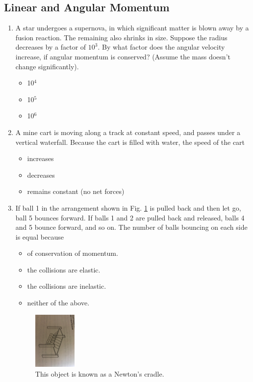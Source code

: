\documentclass[10pt]{article}
\begin{document}
\subsection{Linear and Angular Momentum}
\begin{enumerate}
\item A star undergoes a supernova, in which significant matter is blown away by a fusion reaction.  The remaining also shrinks in size.  Suppose the radius decreases by a factor of $10^3$.  By what factor does the angular velocity increase, if angular momentum is conserved? (Assume the mass doesn't change significantly).
\begin{itemize}
\item 10$^4$
\item 10$^5$
\item 10$^6$
\end{itemize}
\item A mine cart is moving along a track at constant speed, and passes under a vertical waterfall.  Because the cart is filled with water, the speed of the cart
\begin{itemize}
\item increases
\item decreases
\item remains constant (no net forces)
\end{itemize}
\item If ball 1 in the arrangement shown in Fig. \ref{fig:newton} is pulled back and then let go, ball 5 bounces forward.  If balls 1 and 2 are pulled back and released, balls 4 and 5 bounce forward, and so on.  The number of balls bouncing on each side is equal because
\begin{itemize}
\item of conservation of momentum.
\item the collisions are elastic.
\item the collisions are inelastic.
\item neither of the above.
\end{itemize}
\begin{figure}
\centering
\includegraphics[width=0.2\textwidth,trim=20cm 5cm 15cm 20cm,clip=true]{newton.jpeg}
\caption{\label{fig:newton} This object is known as a Newton's cradle.}
\end{figure}
\end{enumerate}
\end{document}
